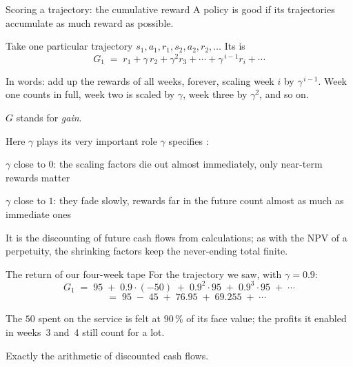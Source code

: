 \begin{frame}{Scoring a trajectory: the cumulative reward}
A policy is good if its trajectories accumulate as much reward as possible.
\begin{lbox}
Take one particular trajectory $s_1, a_1, r_1, s_2, a_2, r_2, \ldots$ Its  is
\[ G_1 \;=\; r_1 + \gamma\, r_2 + \gamma^2 r_3 + \cdots + \gamma^{\,i-1} r_i + \cdots \]
\end{lbox}
\pause
\begin{bullets}
\item In words: add up the rewards of all weeks, forever, scaling week $i$ by $\gamma^{\,i-1}$. Week one counts in full, week two is scaled by $\gamma$, week three by $\gamma^2$, and so on.
\item $G$ stands for \emph{gain}.
\end{bullets}
\end{frame}

\begin{frame}{Here $\gamma$ plays its very important role}
$\gamma$ specifies :
\begin{bullets}
\item $\gamma$ close to $0$: the scaling factors die out almost immediately, only near-term rewards matter
\item $\gamma$ close to $1$: they fade slowly, rewards far in the future count almost as much as immediate ones
\end{bullets}
\pause
\begin{examplebox}
It is the discounting of future cash flows from  calculations; as with the NPV of a perpetuity, the shrinking factors keep the never-ending total finite.
\end{examplebox}
\end{frame}

\begin{frame}{The return of our four-week tape}
For the trajectory we saw, with $\gamma = 0.9$:
\[ G_1 \;=\; 95 \;+\; 0.9 \cdot (-50) \;+\; 0.9^2 \cdot 95 \;+\; 0.9^3 \cdot 95 \;+\; \cdots \]
\pause
\[ \phantom{G_1} \;=\; 95 \;-\; 45 \;+\; 76.95 \;+\; 69.255 \;+\; \cdots \]
\pause
\begin{bullets}
\item The $50$ spent on the service is felt at $90\,\%$ of its face value; the profits it enabled in weeks~3 and~4 still count for a lot.
\item Exactly the arithmetic of discounted cash flows.
\end{bullets}
\end{frame}

